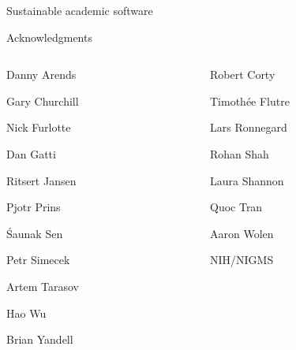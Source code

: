 \documentclass[aspectratio=169,12pt,t]{beamer}
\begin{document}
\begin{frame}{}

\vspace*{16.7mm}

\centerline{\Large Sustainable academic software}

\note{
}
\end{frame}







\begin{frame}[c]{Acknowledgments}

\begin{columns}[T]
  \begin{column}[T]{0.5\textwidth}
    \vspace{0pt}
\bi
\item[] Danny Arends
\item[] Gary Churchill
\item[] Nick Furlotte
\item[] Dan Gatti
\item[] Ritsert Jansen
\item[] Pjotr Prins
\item[] \'Saunak Sen
\item[] Petr Simecek
\item[] Artem Tarasov
\item[] Hao Wu
\item[] Brian Yandell
  \ei
  \end{column} \hfill
\begin{column}[T]{0.5\textwidth}
\vspace*{0mm}

  \bi
\item[] Robert Corty
\item[] Timoth\'ee Flutre
\item[] Lars Ronnegard
\item[] Rohan Shah
\item[] Laura Shannon
\item[] Quoc Tran
\item[] Aaron Wolen
\item[]
\item[] NIH/NIGMS
  \ei
\end{column}
\end{columns}

\note{
}
\end{frame}
\end{document}
